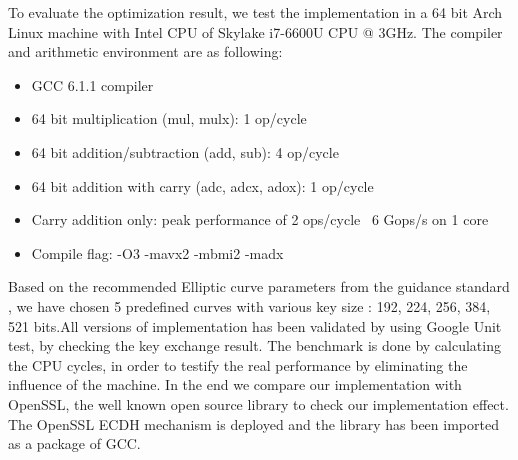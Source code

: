 To evaluate the optimization result, we test the implementation in a 64 bit Arch Linux machine with Intel CPU of Skylake i7-6600U CPU @ 3GHz. The compiler and arithmetic environment are as following: 

  \begin{itemize}
  \setlength\itemsep{0.5em}
  \item{GCC 6.1.1 compiler}
  \item{64 bit multiplication (mul, mulx): 1 op/cycle}
  \item{64 bit addition/subtraction (add, sub): 4 op/cycle}
  \item{64 bit addition with carry (adc, adcx, adox): 1 op/cycle}
  \item{Carry addition only: peak performance of 2 ops/cycle ~6 Gops/s on 1 core}
  \item{Compile flag: -O3 -mavx2 -mbmi2 -madx}
  \end{itemize}
  \setlength\itemsep{1.5em}
Based on the recommended Elliptic curve parameters from the guidance standard \cite{Brown:2009}, we have chosen 5 predefined curves with various key size : 192, 224, 256, 384, 521 bits.All versions of implementation has been validated by using Google Unit test, by checking the key exchange result. The benchmark is done by calculating the CPU cycles, in order to testify the real performance by eliminating the influence of the machine. In the end we compare our implementation with OpenSSL, the well known open source library to check our implementation effect. The OpenSSL ECDH mechanism is deployed and the library has been imported as a package of GCC.


